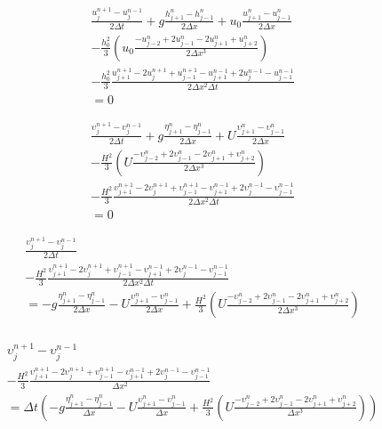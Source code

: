 \documentclass[12pt]{article}
\begin{document}
\begin{multline}
\frac{u^{n+1}_j - u^{n-1}_j}{2\Delta t} + g\frac{h^n_{j+1} -h^n_{j-1} }{2\Delta x}   + u_0\frac{u^n_{j+1} -u^n_{j-1} }{2\Delta x} \\- \frac{h_0^2}{3}\left(u_0 \frac{-u^{n}_{j-2} +2u^{n}_{j-1} -2u^{n}_{j+1} +u^{n}_{j+2}}{2\Delta x^3}  \right)  \\
- \frac{h_0^2}{3}\frac{u^{n+1}_{j+1} -2u^{n+1}_{j} +u^{n+1}_{j-1} - u^{n-1}_{j+1} +2u^{n-1}_{j} -u^{n-1}_{j-1}}{2\Delta x^2\Delta t} 
\\ = 0
\end{multline}


\begin{multline}
\frac{\upsilon^{n+1}_j - \upsilon^{n-1}_j}{2\Delta t} + g\frac{\eta^n_{j+1} -\eta^n_{j-1} }{2\Delta x}   + U\frac{\upsilon^n_{j+1} -\upsilon^n_{j-1} }{2\Delta x} \\- \frac{H^2}{3}\left(U \frac{-\upsilon^{n}_{j-2} +2\upsilon^{n}_{j-1} -2\upsilon^{n}_{j+1} +\upsilon^{n}_{j+2}}{2\Delta x^3}  \right)  \\
- \frac{H^2}{3}\frac{\upsilon^{n+1}_{j+1} -2\upsilon^{n+1}_{j} +\upsilon^{n+1}_{j-1} - \upsilon^{n-1}_{j+1} +2\upsilon^{n-1}_{j} -\upsilon^{n-1}_{j-1}}{2\Delta x^2\Delta t} 
\\ = 0
\end{multline}


\begin{multline}
\frac{\upsilon^{n+1}_j - \upsilon^{n-1}_j}{2\Delta t} \\
- \frac{H^2}{3}\frac{\upsilon^{n+1}_{j+1} -2\upsilon^{n+1}_{j} +\upsilon^{n+1}_{j-1} - \upsilon^{n-1}_{j+1} +2\upsilon^{n-1}_{j} -\upsilon^{n-1}_{j-1}}{2\Delta x^2\Delta t} 
\\ = - g\frac{\eta^n_{j+1} -\eta^n_{j-1} }{2\Delta x}   - U\frac{\upsilon^n_{j+1} -\upsilon^n_{j-1} }{2\Delta x} + \frac{H^2}{3}\left(U \frac{-\upsilon^{n}_{j-2} +2\upsilon^{n}_{j-1} -2\upsilon^{n}_{j+1} +\upsilon^{n}_{j+2}}{2\Delta x^3}  \right)  \\
\end{multline}

\begin{multline}
\upsilon^{n+1}_j - \upsilon^{n-1}_j \\
- \frac{H^2}{3}\frac{\upsilon^{n+1}_{j+1} -2\upsilon^{n+1}_{j} +\upsilon^{n+1}_{j-1} - \upsilon^{n-1}_{j+1} +2\upsilon^{n-1}_{j} -\upsilon^{n-1}_{j-1}}{\Delta x^2} 
\\ =  \Delta t\left(- g\frac{\eta^n_{j+1} -\eta^n_{j-1} }{\Delta x}   - U\frac{\upsilon^n_{j+1} -\upsilon^n_{j-1} }{\Delta x} + \frac{H^2}{3}\left(U \frac{-\upsilon^{n}_{j-2} +2\upsilon^{n}_{j-1} -2\upsilon^{n}_{j+1} +\upsilon^{n}_{j+2}}{\Delta x^3}  \right)\right)  \\
\end{multline}
\end{document}
